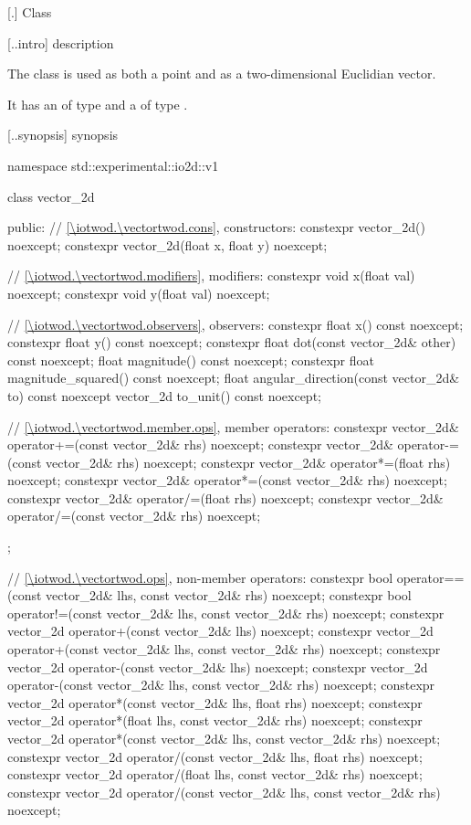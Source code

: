  [\iotwod.\vectortwod] {Class }

 [\iotwod.\vectortwod.intro] { description}

%
\pnum
The class  is used as both a point and as a two-dimensional Euclidian vector.

\pnum
It has an  of type  and a  of type .

 [\iotwod.\vectortwod.synopsis] { synopsis}

\begin{codeblock}
namespace std::experimental::io2d::v1 {
  class vector_2d {
  public:
    // \ref{\iotwod.\vectortwod.cons}, constructors:
    constexpr vector_2d() noexcept;
    constexpr vector_2d(float x, float y) noexcept;

    // \ref{\iotwod.\vectortwod.modifiers}, modifiers:
    constexpr void x(float val) noexcept;
    constexpr void y(float val) noexcept;
    
    // \ref{\iotwod.\vectortwod.observers}, observers:
    constexpr float x() const noexcept;
    constexpr float y() const noexcept;
    constexpr float dot(const vector_2d& other) const noexcept;
    float magnitude() const noexcept;
    constexpr float magnitude_squared() const noexcept;
    float angular_direction(const vector_2d& to) const noexcept
    vector_2d to_unit() const noexcept;
    
    // \ref{\iotwod.\vectortwod.member.ops}, member operators:
    constexpr vector_2d& operator+=(const vector_2d& rhs) noexcept;
    constexpr vector_2d& operator-=(const vector_2d& rhs) noexcept;
    constexpr vector_2d& operator*=(float rhs) noexcept;
    constexpr vector_2d& operator*=(const vector_2d& rhs) noexcept;
    constexpr vector_2d& operator/=(float rhs) noexcept;
    constexpr vector_2d& operator/=(const vector_2d& rhs) noexcept;
  };
  
  // \ref{\iotwod.\vectortwod.ops}, non-member operators:
  constexpr bool operator==(const vector_2d& lhs, const vector_2d& rhs)
    noexcept;
  constexpr bool operator!=(const vector_2d& lhs, const vector_2d& rhs)
    noexcept;
  constexpr vector_2d operator+(const vector_2d& lhs) noexcept;
  constexpr vector_2d operator+(const vector_2d& lhs, const vector_2d& rhs)
    noexcept;
  constexpr vector_2d operator-(const vector_2d& lhs) noexcept;
  constexpr vector_2d operator-(const vector_2d& lhs, const vector_2d& rhs)
    noexcept;
  constexpr vector_2d operator*(const vector_2d& lhs, float rhs) noexcept;
  constexpr vector_2d operator*(float lhs, const vector_2d& rhs) noexcept;
  constexpr vector_2d operator*(const vector_2d& lhs, const vector_2d& rhs)
    noexcept;
  constexpr vector_2d operator/(const vector_2d& lhs, float rhs) noexcept;
  constexpr vector_2d operator/(float lhs, const vector_2d& rhs) noexcept;
  constexpr vector_2d operator/(const vector_2d& lhs, const vector_2d& rhs)
    noexcept;
}
\end{codeblock}

